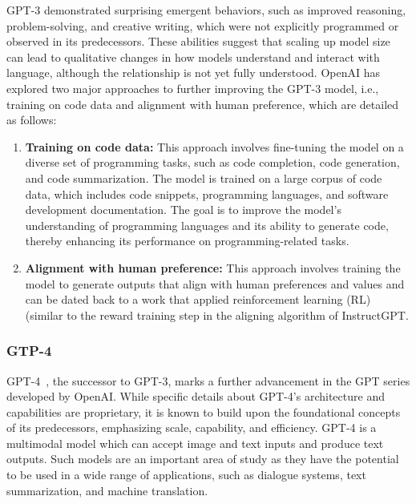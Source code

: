 GPT-3 demonstrated surprising emergent behaviors, such as improved reasoning, problem-solving, and creative writing, which were not explicitly programmed or observed in its predecessors.
These abilities suggest that scaling up model size can lead to qualitative changes in how models understand and interact with language, although the relationship is not yet fully understood.
OpenAI has explored two major approaches to further improving the GPT-3 model, i.e., training on code data and alignment with human preference, which are detailed as follows:
\begin{enumerate}
    \item \textbf{Training on code data:} {
        This approach involves fine-tuning the model on a diverse set of programming tasks, such as code completion, code generation, and code summarization.
        The model is trained on a large corpus of code data, which includes code snippets, programming languages, and software development documentation.
        The goal is to improve the model's understanding of programming languages and its ability to generate code, thereby enhancing its performance on programming-related tasks.
    }
    \item \textbf{Alignment with human preference:} {
        This approach involves training the model to generate outputs that align with human preferences and values and can be dated back to a work that applied reinforcement learning (RL) \cite{christiano2017deep} (similar to the reward training step in the aligning algorithm of InstructGPT.
    }
\end{enumerate}

\subsubsection{GTP-4}
\label{subsubsec:gpt-4}

GPT-4~\cite{gpt4}, the successor to GPT-3, marks a further advancement in the GPT series developed by OpenAI. While specific details about GPT-4's architecture and capabilities are proprietary, it is known to build upon the foundational concepts of its predecessors, emphasizing scale, capability, and efficiency.
GPT-4 is a multimodal model which can accept image and text inputs and produce text outputs.
Such models are an important area of study as they have the potential to be used in a wide range of applications, such as dialogue systems, text summarization, and machine translation.

